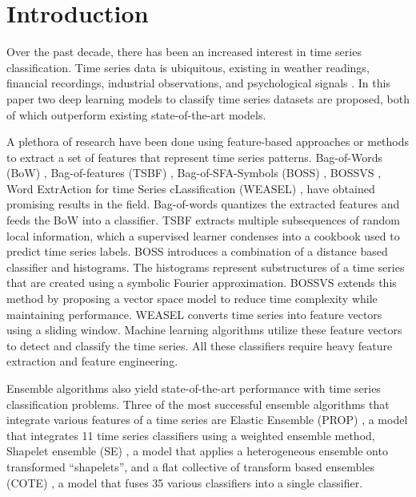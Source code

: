 \documentclass[article]{IEEEtran}
\begin{document}
\IEEEpeerreviewmaketitle

\section{Introduction}


Over the past decade, there has been an increased interest in time series classification. Time series data is ubiquitous, existing in weather readings, financial recordings, industrial observations, and psychological signals \cite{kadous2002temporal}. In this paper two deep learning models to classify time series datasets are proposed, both of which outperform existing state-of-the-art models.
\par A plethora of research have been done using feature-based approaches or methods to extract a set of features that represent time series patterns. Bag-of-Words (BoW) \cite{Lin_2007}, Bag-of-features (TSBF) \cite{Baydogan_2013}, Bag-of-SFA-Symbols (BOSS) \cite{Sch_fer_2014}, BOSSVS \cite{schafer2016scalable}, Word ExtrAction for time Series cLassification (WEASEL) \cite{Schafer_2017}, have obtained promising results in the field. Bag-of-words quantizes the extracted features and feeds the BoW into a classifier. TSBF extracts multiple subsequences of random local information, which a supervised learner condenses into a cookbook used to predict time series labels. BOSS introduces a combination of a distance based classifier and histograms. The histograms represent substructures of a time series that are created using a symbolic Fourier approximation. BOSSVS extends this method by proposing a vector space model to reduce time complexity while maintaining performance.  WEASEL converts time series into feature vectors using a sliding window. Machine learning algorithms utilize these feature vectors to detect and classify the time series.  All these classifiers require heavy feature extraction and feature engineering. \par Ensemble algorithms also yield state-of-the-art performance with time series classification problems. Three of the most successful ensemble algorithms that integrate various features of a time series are Elastic Ensemble (PROP) \cite{Lines_2014}, a model that integrates 11 time series classifiers using a weighted ensemble method, Shapelet ensemble (SE) \cite{bagnall2015time}, a model that applies a heterogeneous ensemble onto transformed “shapelets”, and a flat collective of transform based ensembles (COTE) \cite{bagnall2015time}, a model that fuses 35 various classifiers into a single classifier. 
\end{document}
